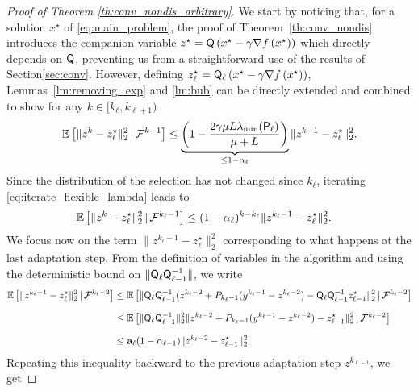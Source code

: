 \begin{proof}[Proof of Theorem \ref{th:conv_nondis_arbitrary}]
We start by noticing that, for a solution $x^\star$ of \eqref{eq:main_problem}, the proof of Theorem~\ref{th:conv_nondis} introduces the companion variable $z^\star =  {\mathsf{Q}}\left(x^\star - \gamma\nabla f\left(x^\star\right)\right)$ which directly depends on ${\mathsf{Q}}$, preventing us from a straightforward use of the results of Section\;\ref{sec:conv}. However, defining $z^{\star}_{\ell} =  {\mathsf{Q}}_\ell\left(x^\star - \gamma\nabla f\left(x^\star\right)\right)$, Lemmas~\ref{lm:removing_exp} and \ref{lm:bub} can be directly extended and combined to show for any $k\in [k_\ell,k_{\ell+1})$ 
\begin{equation}\label{eq:iterate_flexible_lambda}
    \mathbb{E}\left[\|z^{k} - z^{\star}_{\ell}\|_2^2\,|\,\mathcal{F}^{k-1}\right] \leq \underbrace{  \left(1 -  \frac{2\gamma \mu L \lambda_{ \min}({\mathsf{P}}_\ell)}{\mu + L} \right) }_{\leq 1- \alpha_\ell} \|z^{k-1}-z^{\star}_{\ell}\|_2^2 .
\end{equation} 
Since the distribution of the selection has not changed since ${k}_{\ell}$, iterating \eqref{eq:iterate_flexible_lambda} leads to 
\begin{align}\label{eq:iterate_flexible_lambda2}
    \mathbb{E}\left[\|z^{k} - z^{\star}_{\ell}\|_2^2\,|\,\mathcal{F}^{k_{\ell}-1}\right] &\leq (1- \alpha_\ell)^{k-k_\ell} \|z^{k_\ell-1}-z^{\star}_{\ell}\|_2^2 .
\end{align}
We focus now on the term $\|z^{k_\ell-1}-z^{\star}_{\ell}\|_2^2$ corresponding to what happens at the last adaptation step. From the definition of variables in the algorithm and using the deterministic bound on $\|  {\mathsf{Q}}_\ell   {\mathsf{Q}}_{\ell-1}^{-1}\|$, we write
\begin{align}
  \nonumber  \mathbb{E}\left[\|z^{k_\ell-1}-z^{\star}_{\ell}\|_2^2\,|\,\mathcal{F}^{k_{\ell}-2}\right] &\leq   \mathbb{E}\left[ \|  {\mathsf{Q}}_\ell   {\mathsf{Q}}_{\ell-1}^{-1}(z^{k_{\ell}-2} + P_{k_{\ell}-1}(y^{k_{\ell}-1}-z^{k_{\ell}-2}) - {\mathsf{Q}}_\ell   {\mathsf{Q}}_{\ell-1}^{-1}z^{\star}_{\ell-1}\|_2^2\,|\,\mathcal{F}^{k_{\ell}-2}\right] \\[1.5ex]
        &\leq  \mathbb{E}\left[ \|  {\mathsf{Q}}_\ell   {\mathsf{Q}}_{\ell-1}^{-1} \|_2^2   \|  z^{k_{\ell}-2} + P_{k_{\ell}-1}(y^{k_{\ell}-1}-z^{k_{\ell}-2}) - z^{\star}_{\ell-1}\|_2^2\,|\,\mathcal{F}^{k_{\ell}-2}\right] \label{eq:Jadd} \\[1.5ex]
   \nonumber &\leq   \mathbf{a}_\ell  (1-\alpha_{\ell-1}) \|z^{k_\ell-2}-z^{\star}_{\ell-1}\|_2^2. \label{eq:adapt}
\end{align} 
Repeating this inequality backward to the previous adaptation step $z^{k_{\ell-1}}$, we get 

\end{proof}
